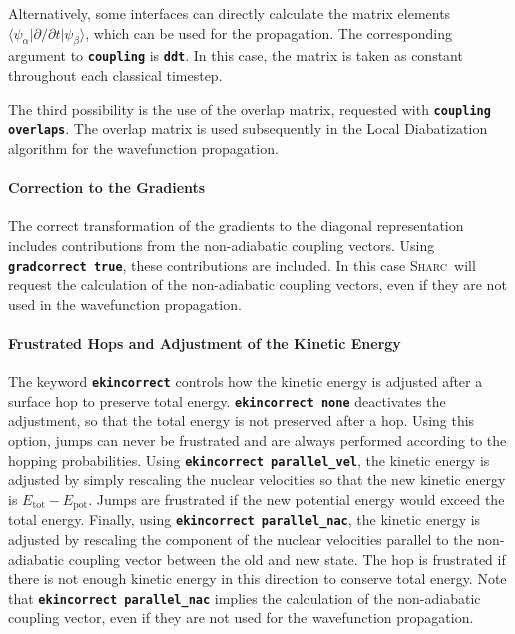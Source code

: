 \documentclass[a4paper,11pt,DIV=15,openany,twoside=false]{scrbook}
\newcommand{\sharc}{\textsc{Sharc}}
\newcommand{\ttt}[1]{\textbf{\texttt{#1}}}
\begin{document}
Alternatively, some interfaces can directly calculate the matrix elements $\langle\psi_\alpha|\partial/\partial t|\psi_\beta\rangle$, which can be used for the propagation. The corresponding argument to \ttt{coupling} is \ttt{ddt}. In this case, the matrix is taken as constant throughout each classical timestep.

The third possibility is the use of the overlap matrix, requested with \ttt{coupling overlaps}. The overlap matrix is used subsequently in the Local Diabatization algorithm for the wavefunction propagation.

\paragraph{Correction to the Gradients}

The correct transformation of the gradients to the diagonal representation includes contributions from the non-adiabatic coupling vectors. Using \ttt{gradcorrect true}, these contributions are included. In this case \sharc\ will request the calculation of the non-adiabatic coupling vectors, even if they are not used in the wavefunction propagation. 

\paragraph{Frustrated Hops and Adjustment of the Kinetic Energy}

The keyword \ttt{ekincorrect} controls how the kinetic energy is adjusted after a surface hop to preserve total energy. \ttt{ekincorrect none} deactivates the adjustment, so that the total energy is not preserved after a hop. Using this option, jumps can never be frustrated and are always performed according to the hopping probabilities. 
Using \ttt{ekincorrect parallel\_vel}, the kinetic energy is adjusted by simply rescaling the nuclear velocities so that the new kinetic energy is $E_{\text{tot}}-E_{\text{pot}}$. Jumps are frustrated if the new potential energy would exceed the total energy.
Finally, using \ttt{ekincorrect parallel\_nac}, the kinetic energy is adjusted by rescaling the component of the nuclear velocities parallel to the non-adiabatic coupling vector between the old and new state. The hop is frustrated if there is not enough kinetic energy in this direction to conserve total energy. Note that \ttt{ekincorrect parallel\_nac} implies the calculation of the non-adiabatic coupling vector, even if they are not used for the wavefunction propagation.
\end{document}
